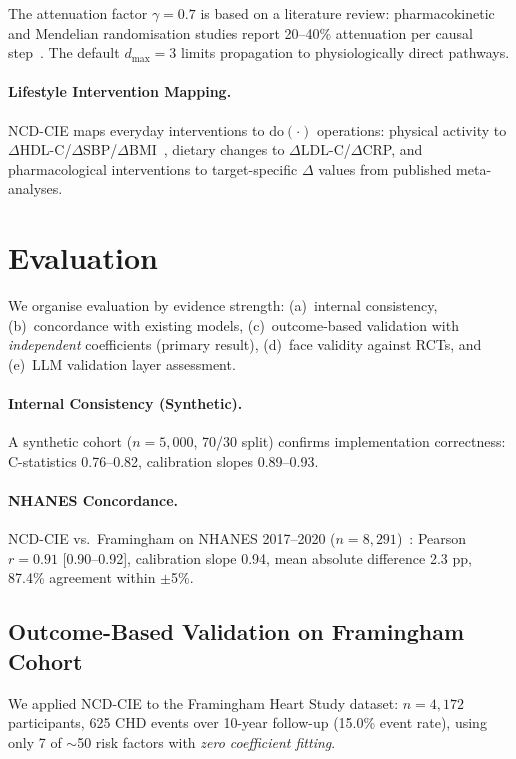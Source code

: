 \documentclass[runningheads]{llncs}
\begin{document}
The attenuation factor $\gamma = 0.7$ is based on a literature review:
pharmacokinetic and Mendelian randomisation studies report 20--40\%
attenuation per causal step~\cite{ctt2010,pearl2009causality}.
The default $d_{\max} = 3$ limits propagation to physiologically
direct pathways.

\paragraph{Lifestyle Intervention Mapping.}
NCD-CIE maps everyday interventions to $\mathrm{do}(\cdot)$
operations: physical activity to $\Delta$HDL-C/$\Delta$SBP/$\Delta$BMI~\cite{naci2019comparative},
dietary changes to $\Delta$LDL-C/$\Delta$CRP, and
pharmacological interventions to target-specific $\Delta$ values
from published meta-analyses.

\section{Evaluation}\label{sec:validation}

We organise evaluation by evidence strength:
(a)~internal consistency,
(b)~concordance with existing models,
(c)~outcome-based validation with \emph{independent} coefficients
(primary result),
(d)~face validity against RCTs, and
(e)~LLM validation layer assessment.

\paragraph{Internal Consistency (Synthetic).}
A synthetic cohort ($n = 5{,}000$, 70/30 split) confirms
implementation correctness: C-statistics 0.76--0.82, calibration
slopes 0.89--0.93.

\paragraph{NHANES Concordance.}
NCD-CIE vs.\ Framingham on NHANES 2017--2020
($n = 8{,}291$)~\cite{nhanes2020}:
Pearson $r = 0.91$ [0.90--0.92],
calibration slope 0.94, mean absolute difference 2.3 pp,
87.4\% agreement within $\pm$5\%.

\subsection{Outcome-Based Validation on Framingham Cohort}\label{sec:framingham}

We applied NCD-CIE to the Framingham Heart Study dataset:
$n = 4{,}172$ participants, 625 CHD events over 10-year follow-up
(15.0\% event rate), using only 7 of ${\sim}$50 risk factors
with \emph{zero coefficient fitting}.
\end{document}
